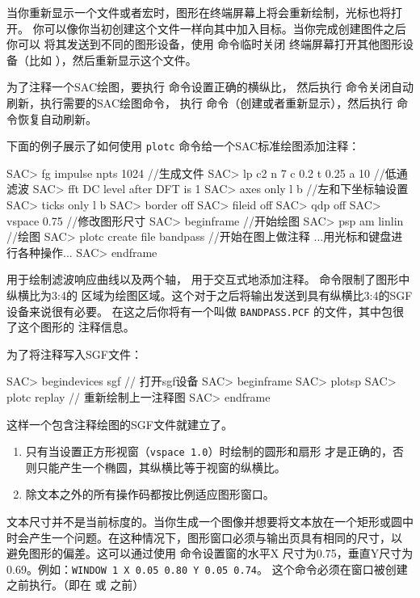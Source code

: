 当你重新显示一个文件或者宏时，图形在终端屏幕上将会重新绘制，光标也将打开。
你可以像你当初创建这个文件一样向其中加入目标。当你完成创建图件之后你可以
将其发送到不同的图形设备，使用  命令临时关闭
终端屏幕打开其他图形设备（比如 ），然后重新显示这个文件。

为了注释一个SAC绘图，要执行  命令设置正确的横纵比，
然后执行  命令关闭自动刷新，执行需要的SAC绘图命令，
执行  命令（创建或者重新显示），然后执行
 命令恢复自动刷新。

下面的例子展示了如何使用 \texttt{plotc} 命令给一个SAC标准绘图添加注释：
\begin{SACCode}
SAC> fg impulse npts 1024                      //生成文件
SAC> lp c2 n 7 c 0.2 t 0.25 a 10               //低通滤波
SAC> fft
 DC level after DFT is 1
SAC> axes only l b                             //左和下坐标轴设置
SAC> ticks only l b
SAC> border off
SAC> fileid off
SAC> qdp off
SAC> vspace 0.75                              //修改图形尺寸
SAC> beginframe                               //开始绘图
SAC> psp am linlin                            //绘图
SAC> plotc create file bandpass               //开始在图上做注释
...用光标和键盘进行各种操作...
SAC> endframe
\end{SACCode}

 用于绘制滤波响应曲线以及两个轴，
用于交互式地添加注释。 命令限制了图形中纵横比为3:4的
区域为绘图区域。这个对于之后将输出发送到具有纵横比3:4的SGF设备来说很有必要。
在这之后你将有一个叫做 \texttt{BANDPASS.PCF} 的文件，其中包很了这个图形的
注释信息。

为了将注释写入SGF文件：
\begin{SACCode}
SAC> begindevices sgf                  // 打开sgf设备
SAC> beginframe
SAC> plotsp
SAC> plotc replay                      // 重新绘制上一注释图
SAC> endframe
\end{SACCode}
这样一个包含注释绘图的SGF文件就建立了。

\begin{enumerate}
    \item 只有当设置正方形视窗（\texttt{vspace 1.0}）时绘制的圆形和扇形
        才是正确的，否则只能产生一个椭圆，其纵横比等于视窗的纵横比。
\item 除文本之外的所有操作码都按比例适应图形窗口。
\end{enumerate}
文本尺寸并不是当前标度的。当你生成一个图像并想要将文本放在一个矩形或圆中
时会产生一个问题。在这种情况下，图形窗口必须与输出页具有相同的尺寸，以
避免图形的偏差。这可以通过使用  命令设置窗的水平X
尺寸为0.75，垂直Y尺寸为0.69。例如：\texttt{WINDOW 1 X 0.05 0.80 Y 0.05 0.74}。
这个命令必须在窗口被创建之前执行。（即在  或
 之前）

